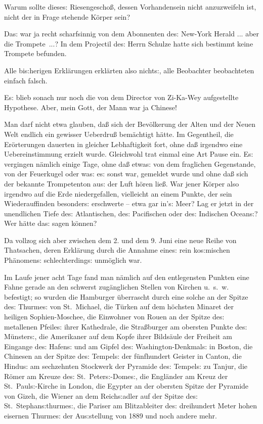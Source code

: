 \documentclass[oneside,12pt]{book}
\newcommand{\s}{s:}
\begin{document}
{\glqq}Warum sollte diese{\s} Riesengescho{\ss}, dessen Vorhandensein
nicht anzuzweifeln ist, nicht der in Frage stehende K\"orper
sein?{\grqq}

Da{\s} war ja recht scharfsinnig von dem Abonnenten de{\s} New-York
Herald ... aber die Trompete~...? In dem Projectil de{\s} Herrn
Schulze hatte sich bestimmt keine Trompete befunden.

Alle bi{\s}herigen Erkl\"arungen erkl\"arten also nicht{\s}, alle
Beobachter beobachteten einfach falsch.

E{\s} blieb sonach nur noch die von dem Director von Zi-Ka-Wey
aufgestellte Hypothese. Aber, mein Gott, der Mann war ja Chinese!

Man darf nicht etwa glauben, da{\ss} sich der Bev\"olkerung der Alten
und der Neuen Welt endlich ein gewisser Ueberdru{\ss} bem\"achtigt
h\"atte. Im Gegentheil, die Er\"orterungen dauerten in gleicher
Lebhaftigkeit fort, ohne da{\ss} irgendwo eine Uebereinstimmung
erzielt wurde. Gleichwohl trat einmal eine Art Pause ein. E{\s}
vergingen n\"amlich einige Tage, ohne da{\ss} etwa{\s} von dem
fraglichen Gegenstande, von der Feuerkugel oder wa{\s} e{\s} sonst
war, gemeldet wurde und ohne da{\ss} sich der bekannte Trompetenton
au{\s} der Luft h\"oren lie{\ss}. War jener K\"orper also irgendwo
auf die Erde niedergefallen, vielleicht an einem Punkte, der sein
Wiederauf\/finden besonder{\s} erschwerte -- etwa gar in'{\s} Meer? Lag
er jetzt in der unendlichen Tiefe de{\s} Atlantischen, de{\s}
Pacifischen oder de{\s} Indischen Ocean{\s}? Wer h\"atte da{\s} sagen
k\"onnen?

Da vollzog sich aber zwischen dem 2. und dem 9. Juni eine neue Reihe
von Thatsachen, deren Erkl\"arung durch die Annahme eine{\s} rein
ko{\s}mischen Ph\"anomen{\s} schlechterding{\s} unm\"oglich war.

Im Laufe jener acht Tage fand man n\"amlich auf den entlegensten
Punkten eine Fahne gerade an den schwerst zug\"anglichen Stellen von
Kirchen u.~s.~w. befestigt; so wurden die Hamburger \"uberrascht durch
eine solche an der Spitze de{\s} Thurme{\s} von St.~Michael, die
T\"urken auf dem h\"ochsten Minaret der heiligen Sophien-Moschee, die
Einwohner von Rouen an der Spitze de{\s} metallenen Pfeile{\s} ihrer
Kathedrale, die Stra{\ss}burger am obersten Punkte de{\s}
M\"unster{\s}, die Amerikaner auf dem Kopfe ihrer Bilds\"aule der
Freiheit am Eingange de{\s} Hafen{\s} und am Gipfel de{\s}
Washington-Denkmal{\s} in Boston, die Chinesen an der Spitze de{\s}
Tempel{\s} der f\"unfhundert Geister in Canton, die Hindu{\s} am
sechzehnten Stockwerk der Pyramide de{\s} Tempel{\s} zu Tanjur, die
R\"omer am Kreuze de{\s} St.~Peter{\s}-Dome{\s}, die Engl\"ander am
Kreuz der St.~Paul{\s}-Kirche in London, die Egypter an der obersten
Spitze der Pyramide von Gizeh, die Wiener an dem Reich{\s}adler auf
der Spitze de{\s} St.~Stephan{\s}thurme{\s}, die Pariser am
Blitzableiter de{\s} dreihundert Meter hohen eisernen Thurme{\s} der
Au{\s}stellung von 1889 und noch andere mehr.
\end{document}
